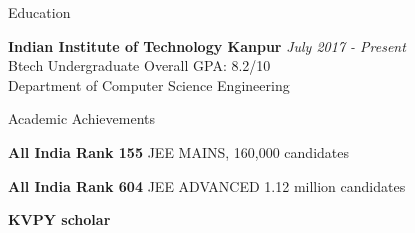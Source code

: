 \documentclass{resume}
\begin{document}
\begin{rSection}{Education}

{\bf Indian Institute of Technology Kanpur} \hfill {\em July 2017 - Present} 
\\ Btech Undergraduate \hfill { Overall GPA: 8.2/10}
\\ Department of Computer Science Engineering  


\end{rSection}


\begin{rSection}{Academic Achievements} \itemsep -2pt
\item \textbf{All India Rank 155} JEE MAINS, 160,000 candidates
\item \textbf{All India Rank 604} JEE ADVANCED 1.12 million candidates
\item \textbf{KVPY scholar}
\end{rSection}
\end{document}
